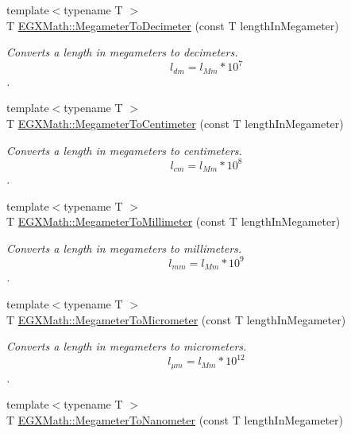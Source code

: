 \begin{DoxyCompactItemize}
{\footnotesize template$<$typename T $>$ }\\T \mbox{\hyperlink{group___e_g_x_math-_conversions-_length_conversions-_s_i-_megameter-_s_i_gaf63f319e0852676dab85aaebc462e8a3}{E\+G\+X\+Math\+::\+Megameter\+To\+Decimeter}} (const T length\+In\+Megameter)
\begin{DoxyCompactList}\small\item\em Converts a length in megameters to decimeters. \[ l_{dm}=l_{Mm} * 10^{7} \]. \end{DoxyCompactList}\item 
{\footnotesize template$<$typename T $>$ }\\T \mbox{\hyperlink{group___e_g_x_math-_conversions-_length_conversions-_s_i-_megameter-_s_i_gacbe2b41169d39f02fb70baedf0f8a9c4}{E\+G\+X\+Math\+::\+Megameter\+To\+Centimeter}} (const T length\+In\+Megameter)
\begin{DoxyCompactList}\small\item\em Converts a length in megameters to centimeters. \[ l_{cm}=l_{Mm} * 10^{8} \]. \end{DoxyCompactList}\item 
{\footnotesize template$<$typename T $>$ }\\T \mbox{\hyperlink{group___e_g_x_math-_conversions-_length_conversions-_s_i-_megameter-_s_i_ga8fd5a24935e05ff3f6e0f7e35379357f}{E\+G\+X\+Math\+::\+Megameter\+To\+Millimeter}} (const T length\+In\+Megameter)
\begin{DoxyCompactList}\small\item\em Converts a length in megameters to millimeters. \[ l_{mm}=l_{Mm} * 10^{9} \]. \end{DoxyCompactList}\item 
{\footnotesize template$<$typename T $>$ }\\T \mbox{\hyperlink{group___e_g_x_math-_conversions-_length_conversions-_s_i-_megameter-_s_i_ga4b0dc1e6dd503c23428038a69ff07146}{E\+G\+X\+Math\+::\+Megameter\+To\+Micrometer}} (const T length\+In\+Megameter)
\begin{DoxyCompactList}\small\item\em Converts a length in megameters to micrometers. \[ l_{\mu m}=l_{Mm} * 10^{12} \]. \end{DoxyCompactList}\item 
{\footnotesize template$<$typename T $>$ }\\T \mbox{\hyperlink{group___e_g_x_math-_conversions-_length_conversions-_s_i-_megameter-_s_i_ga4b35e7fac8eeb2e9e6db36a4c63e3073}{E\+G\+X\+Math\+::\+Megameter\+To\+Nanometer}} (const T length\+In\+Megameter)

\end{DoxyCompactItemize}
